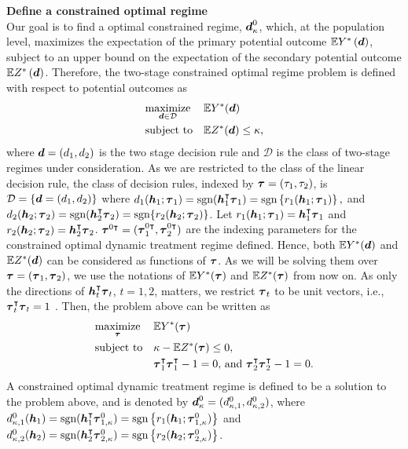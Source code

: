 \documentclass[../main.tex]{subfiles}
\begin{document}
\textbf{\large Define a constrained optimal regime }\\
 Our goal is to find a optimal constrained regime, $\boldsymbol{d}_{\kappa}^{0}$, which, at the population level, maximizes the expectation of the primary potential outcome $\mathbb{E}Y^{*}\left( \boldsymbol{d}\right) $, subject to an upper bound on the expectation of the secondary potential outcome $\mathbb{E}Z^{*}\left( \boldsymbol{d}\right) $.  Therefore, the two-stage constrained optimal regime problem is defined with respect to potential outcomes as
	\begin{equation*}
	\begin{aligned}
	& \underset{\boldsymbol{d} \in \mathcal{D}}{\text{maximize}}
	& & \mathbb{E}Y^*( \boldsymbol{d} ) \\
	& \text{subject to}
	& &  \mathbb{E}Z^*( \boldsymbol{d} ) \le \kappa,
	\end{aligned}
	\end{equation*}
	where $\boldsymbol{d} = (d_1, d_2)$ is the two stage decision rule and $\mathcal{D}$ is the class of two-stage regimes under consideration. As we are restricted to the class of the linear decision rule, the class of decision rules, indexed by $\boldsymbol{\tau} = (\tau_1, \tau_2)$,  is  
	$\mathcal{D} = \{ \boldsymbol{d} = (d_1, d_2)\}$ where $ d_1(\boldsymbol{h}_1; \boldsymbol{\tau}_1) = \text{sgn}(\boldsymbol{h}_1^\intercal\boldsymbol{\tau}_1) = \text{sgn}\left\{r_1(\boldsymbol{h}_1; \boldsymbol{\tau}_1)\right\},$
	and $d_2(\boldsymbol{h}_2;\boldsymbol{\tau}_2) = \text{sgn}(\boldsymbol{h}_2^\intercal\boldsymbol{\tau}_2) = \text{sgn}\{ r_2(\boldsymbol{h}_2; \boldsymbol{\tau}_2 )\}$. Let $r_1(\boldsymbol{h}_1; \boldsymbol{\tau}_1) = \boldsymbol{h}^\intercal_1 \boldsymbol{\tau}_1$ and $r_2(\boldsymbol{h}_2; \boldsymbol{\tau}_2) = \boldsymbol{h}^\intercal_2 \boldsymbol{\tau}_2$. $\boldsymbol{\tau}^{0\intercal} = (\boldsymbol{\tau}_1^{0\intercal},\boldsymbol{\tau}_2^{0\intercal})$ are the indexing parameters for the constrained optimal dynamic treatment regime defined. Hence, both $\mathbb{E}Y^*(\boldsymbol{d})$ and $\mathbb{E}Z^*(\boldsymbol{d})$ can be considered as functions of $\boldsymbol{\tau}$. As we will be solving them over $\boldsymbol{\tau} = ( \boldsymbol{\tau}_1, \boldsymbol{\tau}_2)$, we use the notations of $\mathbb{E}Y^*(\boldsymbol{\tau})$ and $\mathbb{E}Z^*(\boldsymbol{\tau})$ from now on. As only the directions of $\boldsymbol{h}^\intercal_t\boldsymbol{\tau}_t$, $t = 1, 2$, matters, we restrict $\boldsymbol{\tau}_t$ to be unit vectors, i.e., $\boldsymbol{\tau}^\intercal_t\boldsymbol{\tau}_t = 1$ . Then, the problem above can be written as
	\begin{equation}
	\begin{aligned}
	& \underset{\boldsymbol{\tau}}{\text{maximize}}
	& & \mathbb{E}Y^*( \boldsymbol{\tau} ) \\
	& \text{subject to}
	& &  \kappa - \mathbb{E}Z^*( \boldsymbol{\tau} ) \le 0, \\
	& \, 
	& & \boldsymbol{\tau}_1^\intercal \boldsymbol{\tau}_1^\intercal - 1 =0 \text{, and }  \boldsymbol{\tau}_2^\intercal \boldsymbol{\tau}_2^\intercal - 1 = 0.
	\end{aligned}
	\end{equation}
	A constrained optimal dynamic treatment regime  is defined to be a solution to the problem above, and is denoted by
	$\boldsymbol{d}_{\kappa}^0 = ( d_{\kappa,1}^0,  d_{\kappa,2}^0)$, where $d_{\kappa,1}^0(\boldsymbol{h}_1) = \text{sgn}(\boldsymbol{h}^\intercal_1\boldsymbol{\tau}^0_{1,\kappa}) =\text{sgn}\left\{ r_1(\boldsymbol{h}_1; \boldsymbol{\tau}^0_{1,\kappa})\right\}$ and $d_{\kappa,2}^0(\boldsymbol{h}_2) = \text{sgn}(\boldsymbol{h}^\intercal_2\boldsymbol{\tau}^0_{2,\kappa}) = \text{sgn}\left\{ r_2(\boldsymbol{h}_2; \boldsymbol{\tau}^0_{2,\kappa})\right\}$. 
	
\end{document}
